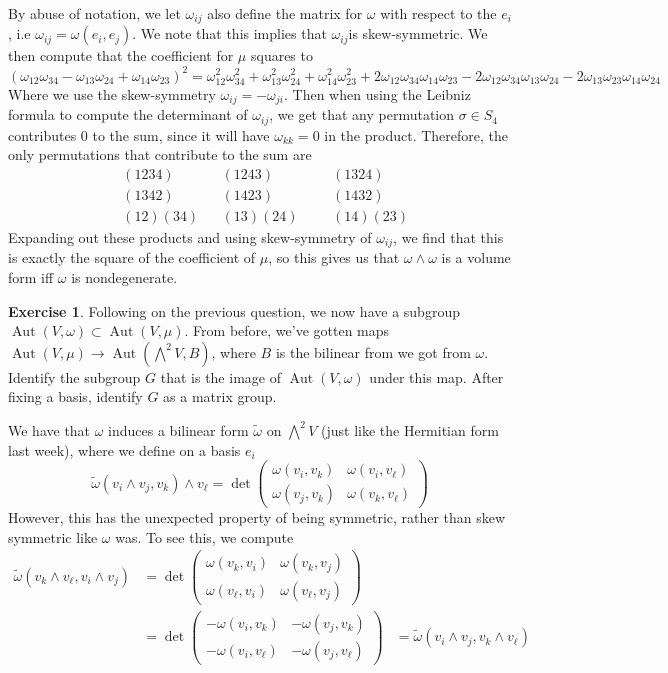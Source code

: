 \documentclass[psamsfonts]{amsart}
\theoremstyle{definition}
\newtheorem{exer}[thm]{Exercise}
\theoremstyle{remark}
\DeclareMathOperator{\Aut}{Aut}
\begin{document}
By abuse of notation, we let $\omega_{ij}$ also define the matrix for $\omega$ with respect to the $e_i$, i.e $\omega_{ij} = \omega(e_i,e_j)$. We note that this implies that $\omega_{ij}$is skew-symmetric. We then compute that the coefficient for $\mu$ squares to
$$(\omega_{12}\omega_{34} - \omega_{13}\omega_{24} + \omega_{14}\omega_{23})^2 = \omega_{12}^2\omega_{34}^2 + \omega_{13}^2\omega_{24}^2 + \omega_{14}^2\omega_{23}^2 + 2\omega_{12}\omega_{34}\omega_{14}\omega_{23} - 2\omega_{12}\omega_{34}\omega_{13}\omega_{24} - 2\omega_{13}\omega_{23}\omega_{14}\omega_{24}$$
Where we use the skew-symmetry $\omega_{ij} = - \omega_{ji}$. Then when using the Leibniz formula to compute the determinant of $\omega_{ij}$, we get that any permutation $\sigma \in S_4$ contributes $0$ to the sum, since it will have $\omega_{kk} = 0$ in the product. Therefore, the only permutations that contribute to the sum are
\begin{align*}
&(1234) &&(1243) &&&(1324) \\
&(1342) &&(1423) &&&(1432) \\
&(12)(34) &&(13)(24) &&&(14)(23) 
\end{align*}
Expanding out these products and using skew-symmetry of $\omega_{ij}$, we find that this is exactly the square of the coefficient of $\mu$, so this gives us that $\omega \wedge \omega$ is a volume form iff $\omega$ is nondegenerate.
%
\begin{exer}
Following on the previous question, we now have a subgroup $\Aut(V, \omega) \subset \Aut(V, \mu)$. From before, we've gotten maps $\Aut(V, \mu) \to \Aut(\bigwedge^2V, B)$, where $B$ is the bilinear from we got from $\omega$. Identify the subgroup $G$ that is the image of $\Aut(V, \omega)$ under this map. After fixing a basis, identify $G$ as a matrix group.
\end{exer}
We have that $\omega$ induces a bilinear form $\tilde{\omega}$ on $\bigwedge^2V$ (just like the Hermitian form last week), where we define on a basis $e_i$ 
$$\tilde{\omega}(v_i \wedge v_j, v_k) \wedge v_\ell = \det\begin{pmatrix}
\omega(v_i,v_k) & \omega(v_i,v_\ell) \\
\omega(v_j,v_k) & \omega(v_k, v_\ell)
\end{pmatrix} $$
However, this has the unexpected property of being symmetric, rather than skew symmetric like $\omega$ was. To see this, we compute
\begin{align*}
\tilde{\omega}(v_k \wedge v_\ell, v_i \wedge v_j) &= \det\begin{pmatrix}
\omega(v_k, v_i) & \omega(v_k, v_j) \\
\omega(v_\ell, v_i) & \omega(v_\ell, v_j)
\end{pmatrix} \\
&= \det\begin{pmatrix}
-\omega(v_i, v_k) & -\omega(v_j, v_k) \\
-\omega(v_i, v_\ell) & -\omega(v_j, v_\ell)
\end{pmatrix}
&= \tilde{\omega}(v_i \wedge v_j, v_k \wedge v_\ell)
\end{align*}
\end{document}
